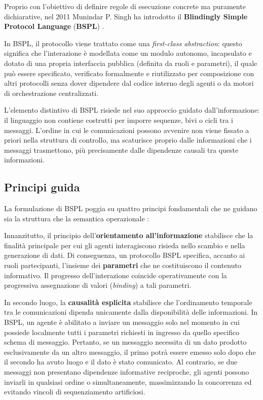 Proprio con l'obiettivo di definire regole di esecuzione concrete ma puramente dichiarative, nel 2011 
Munindar P. Singh ha introdotto il \textbf{Blindingly Simple Protocol Language} 
(\textbf{BSPL}) \autocite{singh2011bspl}.

In BSPL, il protocollo viene trattato come una \emph{first-class abstraction}: questo significa
che l'interazione è modellata come un modulo autonomo, incapsulato e dotato di una propria 
interfaccia pubblica (definita da ruoli e parametri), il quale può essere specificato, verificato 
formalmente e riutilizzato per composizione con altri protocolli senza dover dipendere dal codice 
interno degli agenti o da motori di orchestrazione centralizzati.

L'elemento distintivo di BSPL risiede nel suo approccio guidato dall'informazione: il linguaggio 
non contiene costrutti per imporre sequenze, bivi o cicli tra i messaggi. L'ordine in cui le 
comunicazioni possono avvenire non viene fissato a priori nella struttura di controllo, ma scaturisce 
proprio dalle informazioni che i messaggi trasmettono, più precisamente dalle dipendenze causali 
tra queste informazioni.

\subsection{Principi guida}\label{bspl:principi}

La formulazione di BSPL poggia su quattro principi fondamentali che ne guidano sia la 
struttura che la semantica operazionale \autocite{singh2011bspl}:

Innanzitutto, il principio dell'\textbf{orientamento all'informazione} stabilisce che la finalità 
principale per cui gli agenti interagiscono risieda nello scambio e nella generazione di dati.
Di conseguenza, un protocollo BSPL specifica, accanto ai ruoli partecipanti, l'insieme dei 
\textbf{parametri} che ne costituiscono il contenuto informativo. Il progresso dell'interazione 
coincide operativamente con la progressiva assegnazione di valori (\emph{binding}) a tali parametri.

In secondo luogo, la \textbf{causalità esplicita} stabilisce che 
l'ordinamento temporale tra le comunicazioni dipenda unicamente dalla disponibilità delle 
informazioni. In BSPL, un agente è abilitato a inviare un messaggio solo nel 
momento in cui possiede localmente tutti i parametri richiesti in ingresso da quello specifico 
schema di messaggio. Pertanto, se un messaggio necessita di un dato prodotto esclusivamente da 
un altro messaggio, il primo potrà essere emesso solo dopo che il secondo ha avuto luogo e il 
dato è stato comunicato. Al contrario, se due messaggi non presentano dipendenze informative 
reciproche, gli agenti possono inviarli in qualsiasi ordine o simultaneamente, massimizzando 
la concorrenza ed evitando vincoli di sequenziamento artificiosi.

